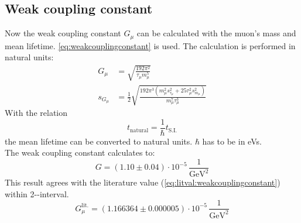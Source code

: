 \subsection{Weak coupling constant}
Now the weak coupling constant $G_\mu$ can be calculated with the muon's mass and mean lifetime. \autoref{eq:weakcouplingconstant} is used. The 
calculation is performed in natural units:
\begin{equation}
    \begin{split}
        G_\mu &= \sqrt{\frac{192 \pi^2}{\tau_\mu m_\mu^5}} \\
        s_{G_\mu} &= \frac{1}{2} \sqrt{\frac{192 \pi^3 \left( m_\mu^2 s_{\tau_\mu}^2 + 25 \tau_\mu^2 s_{m_\mu}^2 \right)}{m_\mu^7 \tau_\mu^3}}
    \end{split}
\end{equation}
With the relation
\begin{equation}
    t_\text{natural} = \frac{1}{\hbar} t_\text{S.I.}
\end{equation}
the mean lifetime can be converted to natural units. $\hbar$ has to be in eVs. \\
The weak coupling constant calculates to:
\begin{equation}
    G = (1.10 \pm 0.04) \cdot 10^{-5}\,\frac{1}{\text{GeV}^2}
\end{equation}
This result agrees with the literature value (\autoref{eq:litval:weakcouplingconstant}) within 2-\textsigma-interval.
\begin{equation}
    G_\mu^{\text{lit.}} = \left( 1.166364 \pm 0.000005 \right) \cdot 10^{-5}\,\frac{1}{\text{GeV}^2}
\end{equation}